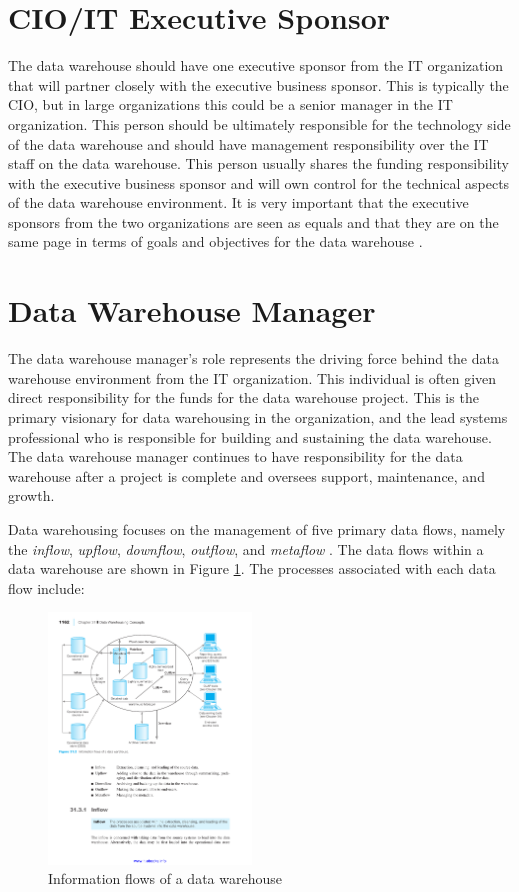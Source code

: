 \documentclass{vldb}
\begin{document}
\section{CIO/IT Executive Sponsor}
The data warehouse should have one executive sponsor from the IT organization that will partner closely with the executive business sponsor. This is typically the CIO, but in large organizations this could be a senior manager in the IT organization. This person should be ultimately responsible for the technology side of the data warehouse and should have management responsibility over the IT staff on the data warehouse. This person usually shares the funding responsibility with the executive business sponsor and will own control for the technical aspects of the data warehouse environment. It is very important that the executive sponsors from the two organizations are seen as equals and that they are on the same page in terms of goals and objectives for the data warehouse \cite{Reeves:DW}.

\section{Data Warehouse Manager}
The data warehouse manager’s role represents the driving force behind the data warehouse environment from the IT organization. This individual is often given direct responsibility for the funds for the data warehouse project. This is the primary visionary for data warehousing in the organization, and the lead systems professional who is responsible for building and sustaining the data warehouse. The data warehouse manager continues to have responsibility for the data warehouse after a project is complete and oversees support, maintenance, and growth.

Data warehousing focuses on the management of five primary data flows, namely the \textit{inflow}, \textit{upflow}, \textit{downflow}, \textit{outflow}, and \textit{metaflow}  \cite{Thomas:DW}. The data flows within a data warehouse are shown in Figure \ref{fig:dwflow}. The processes associated with each data flow include:

\begin{figure}[htb]
\centering
\includegraphics[width=0.48\textwidth]{dwflow}
\caption{Information flows of a data warehouse}
\label{fig:dwflow}
\end{figure}
\end{document}
